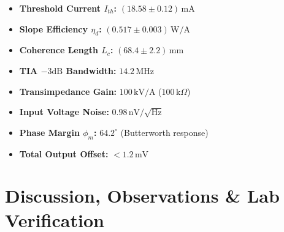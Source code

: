 \documentclass[11pt,a4paper,parskip=half,headsepline=0.6pt,footsepline=0.4pt]{scrartcl}
\begin{document}
\vspace{1pt}

\begin{minipage}[t]{0.48\linewidth}
  \begin{tcolorbox}[accentcard, title={\small \textcolor{navyprimary}{\faCheckCircle\ Measured Key Parameters}}, colframe=tealaccent]
    \small
    \begin{itemize}[leftmargin=1.2em, itemsep=1.5pt]
      \item \textbf{Threshold Current $I_{th}$:} $(18.58 \pm 0.12)\,\text{mA}$
      \item \textbf{Slope Efficiency $\eta_d$:} $(0.517 \pm 0.003)\,\text{W/A}$
      \item \textbf{Coherence Length $L_c$:} $(68.4 \pm 2.2)\,\text{mm}$
      \item \textbf{TIA $-3\text{dB}$ Bandwidth:} $14.2\,\text{MHz}$
    \end{itemize}
  \end{tcolorbox}
\end{minipage}%
\hfill
\begin{minipage}[t]{0.48\linewidth}
  \begin{tcolorbox}[accentcard, title={\small \textcolor{navyprimary}{\faChartLine\ Circuit Performance Summary}}, colframe=tealaccent]
    \small
    \begin{itemize}[leftmargin=1.2em, itemsep=1.5pt]
      \item \textbf{Transimpedance Gain:} $100\,\text{kV/A}$ ($100\,\text{k}\Omega$)
      \item \textbf{Input Voltage Noise:} $0.98\,\text{nV}/\sqrt{\text{Hz}}$
      \item \textbf{Phase Margin $\phi_m$:} $64.2^\circ$ (Butterworth response)
      \item \textbf{Total Output Offset:} $< 1.2\,\text{mV}$
    \end{itemize}
  \end{tcolorbox}
\end{minipage}

\vspace{4pt}

\section{Discussion, Observations \& Lab Verification}
\end{document}
